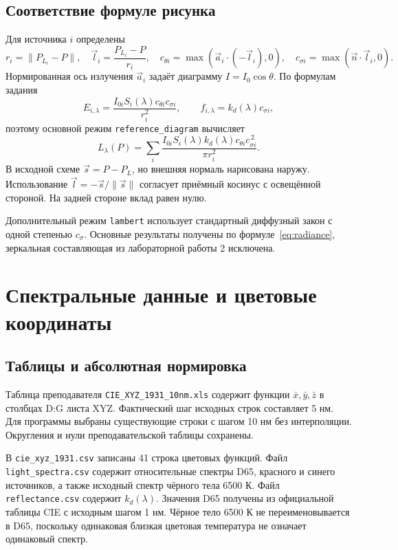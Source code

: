 \documentclass[a4paper,12pt]{article}
\newcommand{\code}[1]{\nolinkurl{#1}}
\begin{document}
\subsection{Соответствие формуле рисунка}
Для источника $i$ определены
\[
 r_i=\|P_{L_i}-P\|,\quad \vec l_i=\frac{P_{L_i}-P}{r_i},\quad
 c_{\theta i}=\max(\vec a_i\cdot(-\vec l_i),0),\quad
 c_{\sigma i}=\max(\vec n\cdot\vec l_i,0).
\]
Нормированная ось излучения $\vec a_i$ задаёт диаграмму $I=I_0\cos\theta$. По формулам задания
\[
 E_{i,\lambda}=\frac{I_{0i}S_i(\lambda)c_{\theta i}c_{\sigma i}}{r_i^2},
 \qquad f_{i,\lambda}=k_d(\lambda)c_{\sigma i},
\]
поэтому основной режим \code{reference_diagram} вычисляет
\begin{equation}
 L_\lambda(P)=\sum_i
 \frac{I_{0i}S_i(\lambda)k_d(\lambda)c_{\theta i}c_{\sigma i}^{\,2}}
 {\pi r_i^2}.
 \label{eq:radiance}
\end{equation}
В исходной схеме $\vec s=P-P_L$, но внешняя нормаль нарисована наружу. Использование $\vec l=-\vec s/\|\vec s\|$ согласует приёмный косинус с освещённой стороной. На задней стороне вклад равен нулю.

Дополнительный режим \code{lambert} использует стандартный диффузный закон с одной степенью $c_\sigma$. Основные результаты получены по формуле~\eqref{eq:radiance}, зеркальная составляющая из лабораторной работы 2 исключена.

\clearpage
\section{Спектральные данные и цветовые координаты}
\subsection{Таблицы и абсолютная нормировка}

Таблица преподавателя \code{CIE_XYZ_1931_10nm.xls} содержит функции $\bar x,\bar y,\bar z$ в столбцах D:G листа XYZ. Фактический шаг исходных строк составляет 5 нм. Для программы выбраны существующие строки с шагом 10 нм без интерполяции. Округления и нули преподавательской таблицы сохранены.

В \code{cie_xyz_1931.csv} записаны 41 строка цветовых функций. Файл \code{light_spectra.csv} содержит относительные спектры D65, красного и синего источников, а также исходный спектр чёрного тела 6500 К. Файл \code{reflectance.csv} содержит $k_d(\lambda)$. Значения D65 получены из официальной таблицы CIE с исходным шагом 1 нм. Чёрное тело 6500 К не переименовывается в D65, поскольку одинаковая близкая цветовая температура не означает одинаковый спектр.
\end{document}
